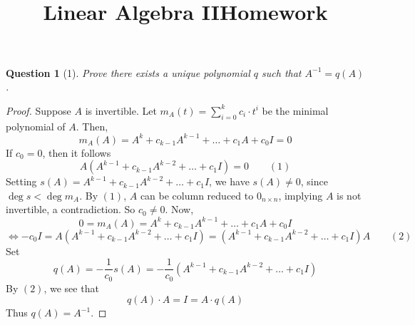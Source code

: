 \documentclass[11pt]{article}
\title{\vspace{-50pt}
\Huge \name
\\\vspace{20pt}
\huge Linear Algebra II\hfill Homework \hw}
\author{}
\date{}
\theoremstyle{quest}
\newtheorem*{question}{Question}
\begin{document}
\maketitle

\begin{question}[1]
Prove there exists a unique polynomial $q$ such that $A^{-1} = q(A)$.
\end{question}
\begin{proof}
Suppose $A$ is invertible. Let $m_A(t) = \sum_{i = 0}^k c_i \cdot t^i$ be the minimal polynomial of $A$. Then,
$$m_A(A) = A^k + c_{k-1} A^{k-1} + \ldots + c_1 A + c_0 I = 0$$
If $c_0 = 0$, then it follows
$$A(A^{k-1} + c_{k-1}A^{k-2} + \ldots + c_1 I) = 0\ \ \ \ \ \ \ \ \ (1)$$
Setting $s(A) = A^{k-1} + c_{k-1}A^{k-2} + \ldots + c_1 I$, we have $s(A) \ne 0$, since $\deg s < \deg m_A$. By $(1)$, $A$ can be column reduced to $0_{n \times n}$, implying $A$ is not invertible, a contradiction. So $c_0 \ne 0$. Now,
$$0 = m_A(A) = A^k + c_{k-1} A^{k-1} + \ldots + c_1 A + c_0 I $$
$$\iff -c_0 I = A(A^{k-1} + c_{k-1}A^{k-2} + \ldots + c_1 I) = (A^{k-1} + c_{k-1}A^{k-2} + \ldots + c_1 I)A\ \ \ \ \ \ \ \ \ (2)$$
Set $$q(A) = -\frac{1}{c_0} s(A) = -\frac{1}{c_0} (A^{k-1} + c_{k-1}A^{k-2} + \ldots + c_1 I)$$
By $(2)$, we see that
$$q(A) \cdot A = I = A \cdot q(A)$$
Thus $q(A) = A^{-1}$.
\end{proof}
\end{document}
